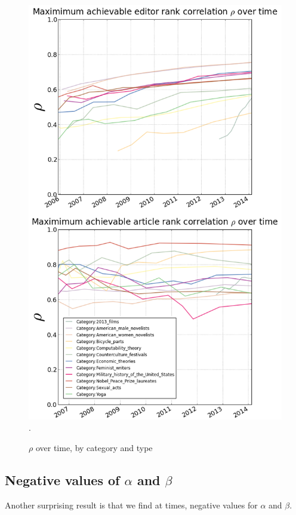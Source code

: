 \begin{figure}[!t]
\centering
\includegraphics[width=0.9\columnwidth]{Figures/rho_combined.png}.
\caption{$\rho$ over time, by category and type}
\label{fig:rhotime}
\end{figure}



\subsection{Negative values of $\alpha$ and $\beta$}
Another surprising result is that we find at times, negative values for $\alpha$ and $\beta$.


